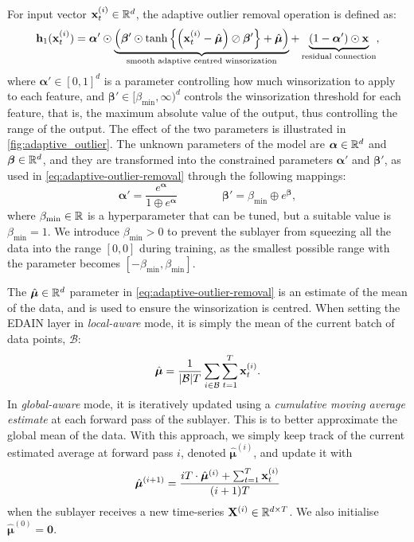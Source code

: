 \documentclass{statsmsc}
\begin{document}
{For input vector $\mathbf{x}_t^{(i)} \in \mathbb{R}^d$, the adaptive outlier removal operation is defined as:
\begin{equation}\label{eq:adaptive-outlier-removal}
    \mathbf{h}_1(\mathbf{x}_t^{(i)})=\bm\alpha' \odot \underbrace{\left(\bm\beta' \odot
        \tanh\left\{\left(\mathbf{x}_t^{(i)}-\hat{\bm\mu}\right) \oslash \bm\beta'  \right\}+\hat{\bm\mu}
\right)}_{\text{smooth adaptive centred winsorization}}
    +\underbrace{\left(1-\bm\alpha' \right) \odot \mathbf{x}}_{\text{residual connection}},
\end{equation}
where
$\bm\alpha' \in [0,1]^d$ is a parameter controlling how much winsorization to apply to each feature,
and $\bm\beta' \in [\beta_{\text{min}},\infty)^d$ controls the winsorization threshold for
each feature, that is, the maximum absolute value of the output, thus controlling the range of the
output. The effect of the two parameters is illustrated in \cref{fig:adaptive_outlier}.
The unknown parameters of the model are $\bm\alpha \in \mathbb{R}^d$ and $\bm\beta \in \mathbb{R}^d$, and they
are transformed into the constrained parameters $\bm\alpha'$ and $\bm\beta'$, as used in
\cref{eq:adaptive-outlier-removal} through the following  mappings:
\begin{equation}
    \bm\alpha'=\frac{e^{\bm\alpha}}{1\oplus e^{\bm\alpha}} \qquad\qquad
    \bm\beta'=\beta_{\text{min}}\oplus e^{\bm\beta},
\end{equation}
where $\beta_{\textrm{min}} \in \mathbb{R}$ is a hyperparameter that can be tuned, but a suitable value is $\beta_{\textrm{min}}=1$. We introduce $\beta_{\textrm{min}}>0$ to prevent the sublayer from
squeezing all the data into the range $[0,0]$ during training, as the smallest possible range
with the parameter becomes $[-\beta_{\textrm{min}}, \beta_{\textrm{min}}]$.


The $\hat{\bm\mu}\in \mathbb{R}^d$ parameter in \cref{eq:adaptive-outlier-removal} is an estimate of the mean of the data, and is used
to ensure the winsorization is centred. When setting the \ac{EDAIN} layer in \textit{local-aware}
mode, it is simply the mean of the current batch of data points, $\mathcal{B}$:
\begin{equation}
    \hat{\bm\mu}=\frac{1}{|\mathcal{B}| T} \sum_{i \in \mathcal{B}} \sum_{t=1}^T \bfx_{t}^{(i)}. %
\end{equation}
In \textit{global-aware} mode, it is iteratively updated using a \textit{cumulative
moving average estimate} at each forward pass of the sublayer.
This is to better approximate the global mean of the data.
With this approach, we simply keep track of the current estimated average at forward pass $i$,
denoted $\hat{\bm\mu}^{(i)}$, and update it with
\begin{equation}
    \hat{\bm\mu}^{(i+1)}= \frac{iT\cdot\hat{\bm\mu}^{(i)}+\sum^{T}_{t=1} \mathbf{x}_t^{(i)}}{(i+1)T}
\end{equation}
when the sublayer receives a new time-series $\mathbf{X}^{(i)}\in\mathbb{R}^{d\times T}$. We also initialise
$\hat{\bm\mu}^{(0)}=\mathbf{0}$.

}
\end{document}
